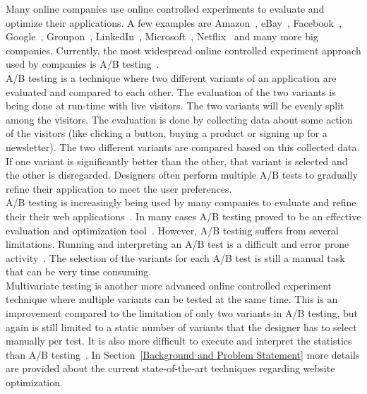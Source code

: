 \documentclass{report}
\begin{document}
Many online companies use online controlled experiments to evaluate and optimize their applications. A few examples are Amazon~\cite{amazon}, eBay~\cite{ebay}, Facebook~\cite{facebook}, Google~\cite{google}, Groupon~\cite{groupon}, LinkedIn~\cite{linkedin}, Microsoft~\cite{microsoft}, Netflix~\cite{netflix} and many more big companies. Currently, the most widespread online controlled experiment approach used by companies is A/B testing~\cite{kohavi2013online}.\\

A/B testing is a technique where two different variants of an application are evaluated and compared to each other. The evaluation of the two variants is being done at run-time with live visitors. The two variants will be evenly split among the visitors. The evaluation is done by collecting data about some action of the visitors (like clicking a button, buying a product or signing up for a newsletter). The two different variants are compared based on this collected data. If one variant is significantly better than the other, that variant is selected and the other is disregarded. Designers often perform multiple A/B tests to gradually refine their application to meet the user preferences.\\

A/B testing is increasingly being used by many companies to evaluate and refine their their web applications~\cite{kohavi2013online}. In many cases A/B testing proved to be an effective evaluation and optimization tool~\cite{abtestwired, kohavi2007practical}. However, A/B testing suffers from several limitations. Running and interpreting an A/B test is a difficult and error prone activity~\cite{crook2009seven}. The selection of the variants for each A/B test is still a manual task that can be very time consuming.\\

Multivariate testing is another more advanced online controlled experiment technique where multiple variants can be tested at the same time. This is an improvement compared to the limitation of only two variants in A/B testing, but again is still limited to a static number of variants that the designer has to select manually per test. It is also more difficult to execute and interpret the statistics than A/B testing~\cite{diff}. In Section~\ref{Background and Problem Statement} more details are provided about the current state-of-the-art techniques regarding website optimization.\\
\end{document}
